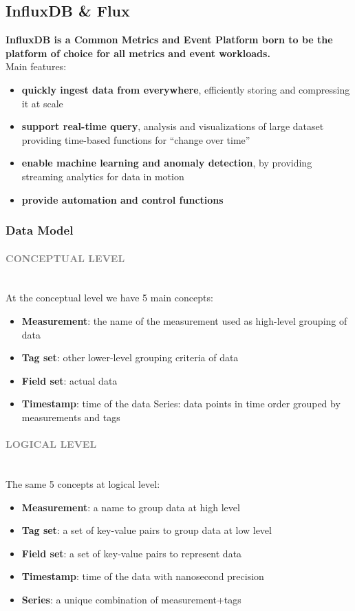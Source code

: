 \documentclass[10pt,a4paper]{article}
\newcommand{\myparagraph}[1]{\paragraph{\normalsize{\textcolor{gray}{\uppercase{\textbf{#1}}}} }\mbox{} \vspace{0.5em}\\}
\begin{document}
\subsection{InfluxDB \& Flux}
\textbf{InfluxDB is a Common Metrics and Event Platform born to be the platform of choice for all metrics and event workloads.} \\
Main features:
\begin{itemize}
	\item \textbf{quickly ingest data from everywhere}, efficiently storing and compressing it at scale
	\item \textbf{support real-time query}, analysis and visualizations of large dataset providing time-based functions for “change over time”
	\item \textbf{enable machine learning and anomaly detection}, by providing streaming analytics for data in motion
	\item \textbf{provide automation and control functions}
\end{itemize}
\subsubsection{Data Model}
\myparagraph{Conceptual Level}
At the conceptual level we have 5 main concepts:
\begin{itemize}
	\item \textbf{Measurement}: the name of the measurement used as high-level grouping of data
	\item \textbf{Tag set}: other lower-level grouping criteria of data
	\item \textbf{Field set}: actual data
	\item \textbf{Timestamp}: time of the data
Series: data points in time order grouped by measurements and tags
\end{itemize}
\myparagraph{Logical Level}
The same 5 concepts at logical level:
\begin{itemize}
	\item \textbf{Measurement}: a name to group data at high level
	\item \textbf{Tag set}: a set of key-value pairs to group data at low level
	\item \textbf{Field set}: a set of key-value pairs to represent data
	\item \textbf{Timestamp}: time of the data with nanosecond precision
	\item \textbf{Series}: a unique combination of measurement+tags
\end{itemize}
\end{document}
